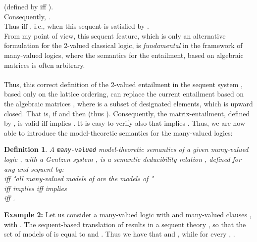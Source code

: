 \documentclass[10pt,twocolumn]{article}
\newtheorem{definition}{Definition}
\begin{document}
 (defined by  iff ).\\
Consequently, .\\
Thus  iff , i.e., when this sequent is satisfied by .\\
  From my
 point of view, this sequent feature, which is only an alternative formulation
 for the 2-valued classical logic, is \emph{fundamental} in the framework of
 many-valued logics, where  the semantics for the entailment,
 based on algebraic
 matrices  is often arbitrary.
\\\\
 Thus, this correct definition of the 2-valued entailment in the sequent system , based only on the lattice
 ordering, can replace the current entailment based on the algebraic
 matrices , where  is a subset of designated
 elements, which is upward closed. That is, if  and  then  (thus ). Consequently, the matrix-entailment,  defined by ,
 is valid iff  implies .
 It is easy to verify also that  implies .
 Thus, we are now able  to introduce the model-theoretic semantics for the many-valued logics:
\begin{definition}   \label{def:manyvaluation}
 A \verb"many-valued"  model-theoretic semantics of a given many-valued logic , with a Gentzen system ,
is a semantic deducibility relation
 ,
 defined for any  and sequent 
 by:\\  iff "all many-valued models of  are the models of
 "\\
iff  implies 
 iff  implies \\
 iff .
\end{definition}
\textbf{Example 2:} Let us consider a many-valued logic with
  and many-valued clauses , with . The sequent-based
 translation of  results in a sequent theory , so that the set of models of  is equal to
  and . Thus we have that  and , while for every , .
 \\
\end{document}
